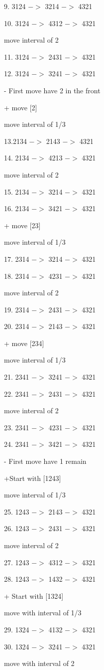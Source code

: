 \documentclass[runningheads]{llncs}
\begin{document}
9. 3124 $->$ 3214 $->$ 4321

10. 3124 $->$ 4312 $->$ 4321

move interval of 2

11. 3124 $->$ 2431 $->$ 4321

12. 3124 $->$ 3241 $->$ 4321 

- First move have 2 in the front 

+ move [2]

move interval of 1/3

13.2134 $->$ 2143 $->$ 4321 

14. 2134 $->$ 4213 $->$ 4321 

move interval of 2

15. 2134 $->$ 3214 $->$ 4321

16. 2134 $->$ 3421 $->$ 4321 

+ move [23]

move interval of 1/3

17. 2314 $->$ 3214 $->$ 4321

18. 2314 $->$ 4231 $->$ 4321

move interval of 2

19. 2314 $->$ 2431 $->$ 4321

20. 2314 $->$ 2143 $->$ 4321 

+ move [234]

move interval of 1/3

21. 2341 $->$ 3241 $->$ 4321 

22. 2341 $->$ 2431 $->$ 4321

move interval of 2

23. 2341 $->$ 4231 $->$ 4321

24. 2341 $->$ 3421 $->$ 4321

- First move have 1 remain 

+Start with [1243]

move interval of 1/3

25. 1243 $->$ 2143 $->$ 4321

26. 1243 $->$ 2431 $->$ 4321

move interval of 2

27. 1243 $->$ 4312 $->$ 4321

28. 1243 $->$ 1432 $->$ 4321

+ Start with [1324]

move with interval of 1/3

29. 1324 $->$ 4132 $->$ 4321

30. 1324 $->$ 3241 $->$ 4321

move with interval of 2
\end{document}
